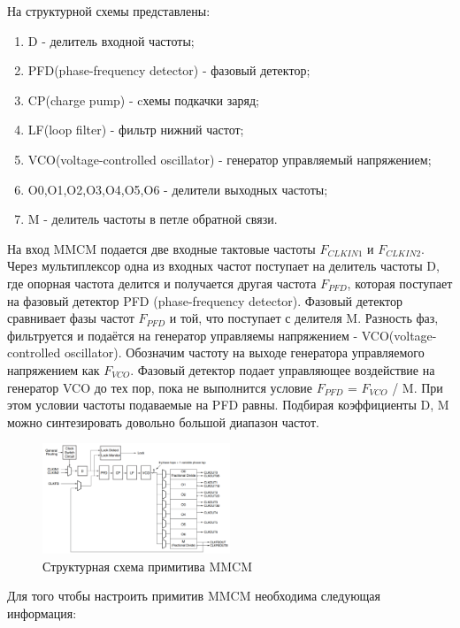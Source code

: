 \documentclass[a4paper,oneside ,14pt]{extreport}
\begin{document}
На структурной схемы представлены:

\begin{enumerate}
	\item D - делитель входной частоты;
	\item PFD(phase-frequency detector) - фазовый детектор;
	\item CP(charge pump) - cхемы подкачки заряд;
	\item LF(loop filter) - фильтр нижний частот;
	\item VCO(voltage-controlled oscillator) - генератор управляемый напряжением;
	\item O0,O1,O2,O3,O4,O5,O6 - делители выходных частоты;
	\item M - делитель частоты в петле обратной связи.
\end{enumerate}

На вход MMCM подается две входные тактовые частоты \(F_{CLKIN1}\) и \(F_{CLKIN2}\). Через мультиплексор одна из входных частот поступает на делитель частоты D, где опорная частота делится  и получается другая частота \(F_{PFD}\), 
которая поступает на фазовый детектор PFD (phase-frequency detector).
Фазовый детектор сравнивает фазы частот \(F_{PFD}\) и той, что поступает с делителя M. Разность фаз, фильтруется и подаётся на генератор управляемы напряжением - VCO(voltage-controlled oscillator). Обозначим частоту на выходе генератора управляемого напряжением как \(F_{VCO}\). Фазовый детектор подает управляющее воздействие на генератор VCO до тех пор, пока не выполнится условие \(F_{PFD}\) = \(F_{VCO}\) / M. При этом условии частоты подаваемые на PFD равны. Подбирая коэффициенты D, M можно синтезировать довольно большой диапазон частот. 

\begin{figure}[!ht]
	\centering
	\includegraphics[width=0.5\textwidth]{image/MMCM2_BASE.PNG}
	\caption{Структурная схема примитива MMCM}
	\label{MMCM2_BASE}
\end{figure}

Для того чтобы настроить примитив MMCM необходима следующая информация:
\end{document}
